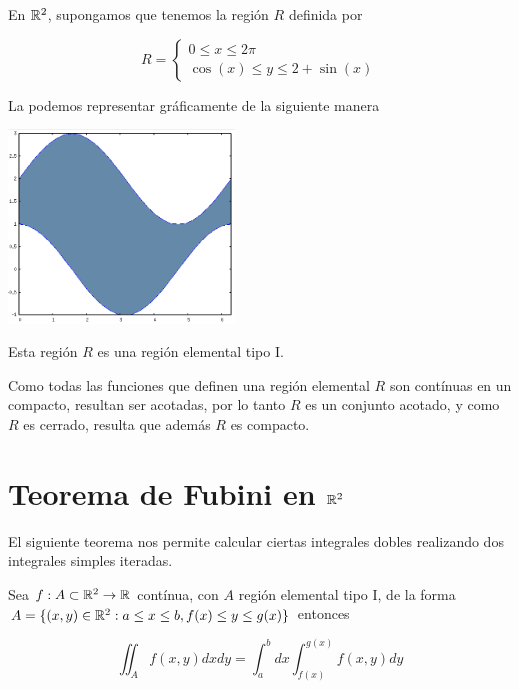 \begin{example}
En $\mathbb{R}^2$, supongamos que tenemos la región $R$ definida por

$$ R = \begin{cases} 0 \leq x \leq 2\pi \\ \cos(x) \leq y \leq 2 + \sin(x) \end{cases}$$

La podemos representar gráficamente de la siguiente manera

\begin{center}
\includegraphics[width=6cm]{images/04_analisis2/region_tipo_1.png}
\end{center}

Esta región $R$ es una región elemental tipo I. 
\end{example}

\begin{observation}
Como todas las funciones que definen una región elemental $R$ son contínuas en un compacto, resultan ser acotadas, por lo tanto $R$ es un conjunto acotado, y como $R$ es cerrado, resulta que además $R$ es compacto.
\end{observation}

\section{Teorema de Fubini en $\mathbb{R}^2$}

El siguiente teorema nos permite calcular ciertas integrales dobles realizando dos integrales simples iteradas.

\begin{theorem}[Fubini] 
Sea $f : A \subset \mathbb{R}^2 \to \mathbb{R}$ contínua, con $ A$ región elemental tipo I, de la forma $A = \{(x,y) \in \mathbb{R}^2 : a \leq x \leq b, f(x) \leq y \leq g(x) \}$ entonces

$$ \iint_A f(x,y) dxdy = \int_a^b dx \int_{f(x)}^{g(x)} f(x,y) dy $$
\end{theorem}

